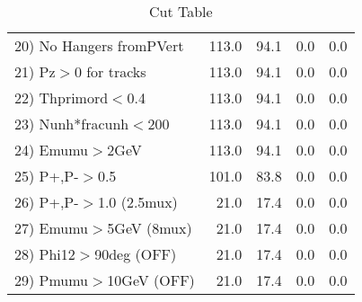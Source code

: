 \begin{table}[h!]
\begin{tabular}{||l||r|r|r|r||}
 20) No Hangers fromPVert &       113.0 &        94.1 &         0.0 &         0.0 \\
 21) Pz$>$0 for tracks    &       113.0 &        94.1 &         0.0 &         0.0 \\
 22) Thprimord$<$0.4      &       113.0 &        94.1 &         0.0 &         0.0 \\
 23) Nunh*fracunh$<$200   &       113.0 &        94.1 &         0.0 &         0.0 \\
 24) Emumu$>$2GeV         &       113.0 &        94.1 &         0.0 &         0.0 \\
 25) P+,P-$>$0.5          &       101.0 &        83.8 &         0.0 &         0.0 \\
 26) P+,P-$>$1.0 (2.5mux) &        21.0 &        17.4 &         0.0 &         0.0 \\
 27) Emumu$>$5GeV  (8mux) &        21.0 &        17.4 &         0.0 &         0.0 \\
 28) Phi12$>$90deg  (OFF) &        21.0 &        17.4 &         0.0 &         0.0 \\
 29) Pmumu$>$10GeV  (OFF) &        21.0 &        17.4 &         0.0 &         0.0 \\
 \hline
 \hline
 \end{tabular}
 \caption{Cut Table \cohjp  }
 \label{tab-cut__jpsi}
 \end{table}
